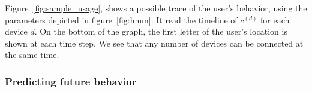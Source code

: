 Figure~\ref{fig:sample_usage}, shows a possible trace of the user's behavior, using the parameters depicted in figure~\ref{fig:hmm}. It read the timeline of $c^{(d)}$ for each device $d$. On the bottom of the graph, the first letter of the user's location is shown at each time step. We see that any number of devices can be connected at the same time.



\subsubsection{Predicting future behavior} %
\label{ssub:predicting_future_behavior}

